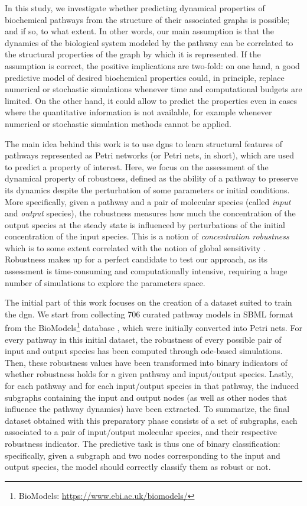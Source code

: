 In this study, we investigate whether predicting dynamical properties of biochemical pathways from the structure of their associated graphs is possible; and if so, to what extent. In other words, our main assumption is that the dynamics of the biological system modeled by the pathway can be correlated to the structural properties of the graph by which it is represented. If the assumption is correct, the positive implications are two-fold: on one hand, a good predictive model of desired biochemical properties could, in principle, replace numerical or stochastic simulations whenever time and computational budgets are limited. On the other hand, it could allow to predict the properties even in cases where the quantitative information is not available, for example whenever numerical or stochastic simulation methods cannot be applied.

The main idea behind this work is to use \glspl{dgn} to learn structural features of pathways represented as Petri networks (or Petri nets, in short), which are used to predict a property of interest. Here, we focus on the assessment of the dynamical property of robustness, defined as the ability of a pathway to preserve its dynamics despite the perturbation of some parameters or initial conditions. More specifically, given a pathway and a pair of molecular species (called \emph{input} and \emph{output} species), the robustness measures how much the concentration of the output species at the steady state is influenced by perturbations of the initial concentration of the input species. This is a notion of \emph{concentration robustness} \citep{kitano2004biological} which is to some extent correlated with the notion of global sensitivity \citep{zi2011sensitivity}. Robustness makes up for a perfect candidate to test our approach, as its assessment is time-consuming and computationally intensive, requiring a huge number of simulations to explore the parameters space.

The initial part of this work focuses on the creation of a dataset suited to train the \gls{dgn}. We start from collecting 706 curated pathway models in SBML format from the BioModels\footnote{BioModels: \url{https://www.ebi.ac.uk/biomodels/}} database \citep{li2010biomodels}, which were initially converted into Petri nets. For every pathway in this initial dataset, the robustness of every possible pair of input and output species has been computed through \gls{ode}-based simulations. Then, these robustness values have been transformed into binary indicators of whether robustness holds for a given pathway and input/output species. Lastly, for each pathway and for each input/output species in that pathway, the induced subgraphs containing the input and output nodes (as well as other nodes that influence the pathway dynamics) have been extracted. To summarize, the final dataset obtained with this preparatory phase consists of a set of subgraphs, each associated to a pair of input/output molecular species, and their respective robustness indicator. The predictive task is thus one of binary classification: specifically, given a subgraph and two nodes corresponding to the input and output species, the model should correctly classify them as robust or not.

